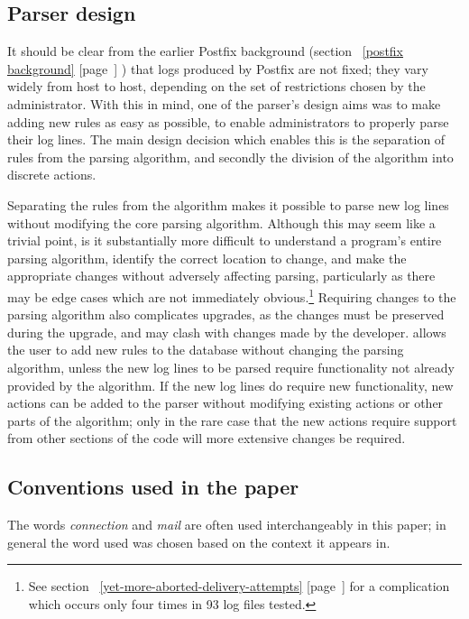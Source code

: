 \documentclass[a4paper,12pt,draft]{article}
\newcommand{\parsername}{\PLP{}}
\newcommand{\refwithpage}[1]{%
    \empty{}\ref{#1} [page~\pageref{#1}]%
}
\begin{document}
\subsection{Parser design}

\label{parser design}

It should be clear from the earlier Postfix background
(section~\refwithpage{postfix background}) that logs produced by Postfix
are not fixed; they vary widely from host to host, depending on the set of
restrictions chosen by the administrator.  With this in mind, one of the
parser's design aims was to make adding new rules as easy as possible, to
enable administrators to properly parse their log lines.  The main design
decision which enables this is the separation of rules from the parsing
algorithm, and secondly the division of the algorithm into discrete
actions.

\label{why separate rules and algorithm}

Separating the rules from the algorithm makes it possible to parse new log
lines without modifying the core parsing algorithm.  Although this may seem
like a trivial point, is it substantially more difficult to understand a
program's entire parsing algorithm, identify the correct location to
change, and make the appropriate changes without adversely affecting
parsing, particularly as there may be edge cases which are not immediately
obvious.\footnote{See
section~\refwithpage{yet-more-aborted-delivery-attempts} for a complication
which occurs only four times in 93 log files tested.}  Requiring changes to
the parsing algorithm also complicates upgrades, as the changes must be
preserved during the upgrade, and may clash with changes made by the
developer.  \parsername{} allows the user to add new rules to the database
without changing the parsing algorithm, unless the new log lines to be
parsed require functionality not already provided by the algorithm.  If the
new log lines do require new functionality, new actions can be added to the
parser without modifying existing actions or other parts of the algorithm;
only in the rare case that the new actions require support from other
sections of the code will more extensive changes be required.

\subsection{Conventions used in the paper}

The words \textit{connection\/} and \textit{mail\/} are often used
interchangeably in this paper; in general the word used was chosen based on
the context it appears in.
\end{document}
